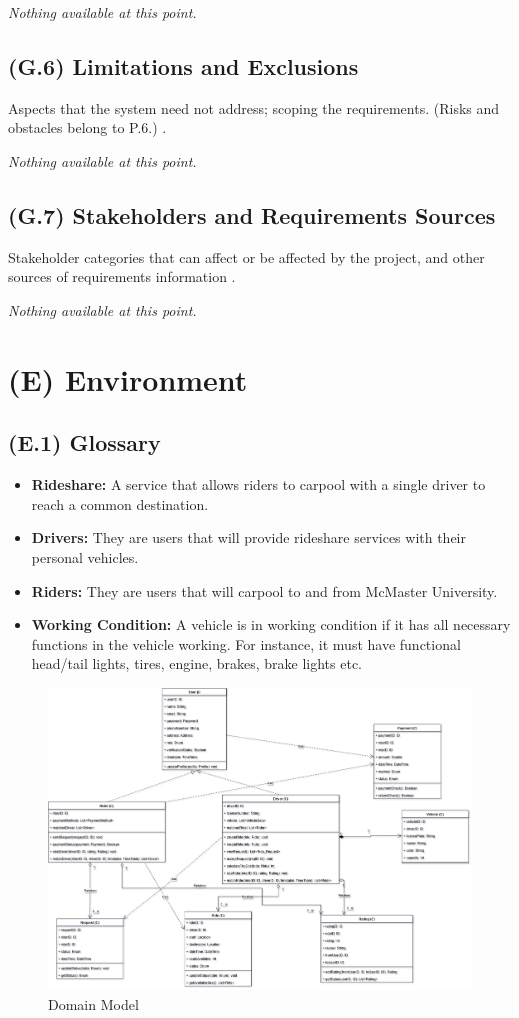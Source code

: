 \documentclass[12pt,letterpaper]{article}
\begin{document}
\textit{Nothing available at this point.}

\subsection{(G.6) Limitations and Exclusions}
Aspects that the system need not address; scoping the requirements. (Risks and obstacles belong to P.6.) \cite{meyer2022}.

\textit{Nothing available at this point.}

\subsection{(G.7) Stakeholders and Requirements Sources}
Stakeholder categories that can affect or be affected by the project, and other sources of requirements information \cite{meyer2022}.

\textit{Nothing available at this point.}

\clearpage

\section{(E) Environment}

\subsection{(E.1) Glossary}
\begin{itemize}
\item \textbf{Rideshare:} A service that allows riders to carpool with a single driver to reach a common destination.
\item \textbf{Drivers:} They are users that will provide rideshare services with their personal vehicles.  
\item \textbf{Riders:} They are users that will carpool to and from McMaster University.
\item \textbf{Working Condition:} A vehicle is in working condition if it has all necessary functions in the vehicle working. For instance, it must have functional head/tail lights, tires, engine, brakes, brake lights etc.
\end{itemize}

\begin{figure}[h] 
    \centering
    \includegraphics[width=0.8\linewidth]{Domain Model.png}
    \caption{Domain Model}
    \label{fig:domain-model}
\end{figure}
\end{document}
